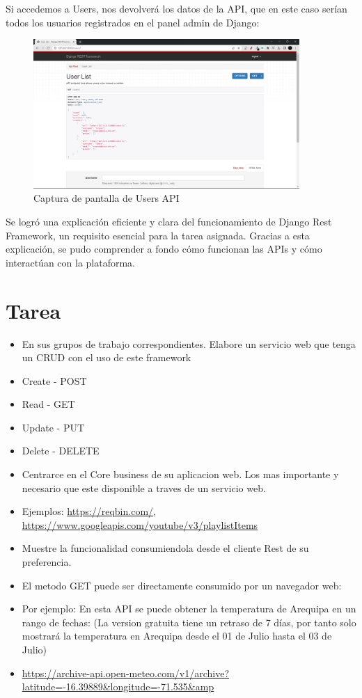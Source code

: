 \documentclass{article}
\begin{document}
        Si accedemos a Users, nos devolverá los datos de la API, que en este caso serían todos los usuarios registrados en el panel admin de Django:
        
        \begin{figure}[H]
            \centering
            \includegraphics[width=0.9\textwidth,keepaspectratio]{img/ejercicio.png}
            \caption{Captura de pantalla de Users API}
            \label{fig:enter-label}
        \end{figure}

        Se logró una explicación eficiente y clara del funcionamiento de Django Rest Framework, un requisito esencial para la tarea asignada. Gracias a esta explicación, se pudo comprender a fondo cómo funcionan las APIs y cómo interactúan con la plataforma.

\section{Tarea}
\begin{itemize}
    \item En sus grupos de trabajo correspondientes. Elabore un servicio web que tenga un CRUD con el uso de este framework
    \item Create - POST
    \item Read - GET
    \item Update - PUT
    \item Delete - DELETE
    \item Centrarce en el Core business de su aplicacion web. Los mas importante y necesario que este disponible a traves de un servicio web.
    \item Ejemplos: \url{https://reqbin.com/}, \url{https://www.googleapis.com/youtube/v3/playlistItems}
    \item Muestre la funcionalidad consumiendola desde el cliente Rest de su preferencia.
    \item El metodo GET puede ser directamente consumido por un navegador web:
    \item Por ejemplo: En esta API se puede obtener la temperatura de Arequipa en un rango de fechas: (La version gratuita tiene un retraso de 7 días, por tanto solo mostrará la temperatura en Arequipa desde el 01 de Julio hasta el 03 de Julio)
    \item \url{https://archive-api.open-meteo.com/v1/archive?latitude=-16.39889&longitude=-71.535&amp}
\end{itemize}
\end{document}
